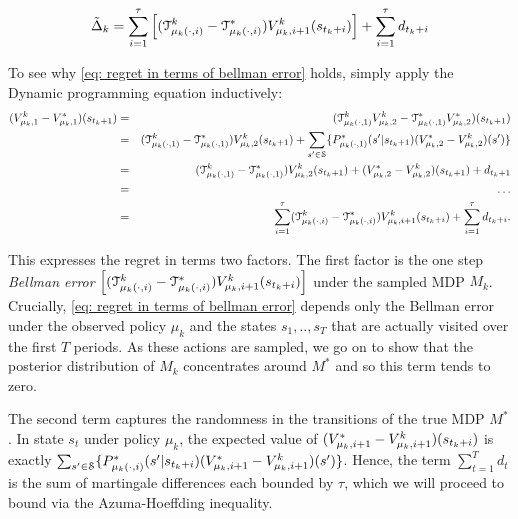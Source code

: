 \begin{equation} \label{eq: regret in terms of bellman error}
\tilde{\Delta}_k = \sum_{i=1}^{\tau} \left[(\mathcal{T}_{\mu_{k}(\cdot,i)}^{k}-\mathcal{T}_{\mu_{k}(\cdot,i)}^{*})V^k_{\mu_{k},i+1}(s_{t_k+i})   \right] + \sum_{i=1}^{\tau} d_{t_k+i}
\end{equation}

To see why \eqref{eq: regret in terms of bellman error} holds, simply apply the Dynamic programming equation inductively: 
\begin{eqnarray*}
(V_{\mu_{k},1}^{k}-V_{\mu_{k},1}^{*})(s_{t_k+1}) &=& (\mathcal{T}_{\mu_{k}(\cdot,1)}^{k} V_{\mu_{k},2}^{k} - \mathcal{T}_{\mu_{k}(\cdot,1)}^{*} V_{\mu_{k},2}^{*})(s_{t_k+1})\\
&=& (\mathcal{T}_{\mu_{k}(\cdot,1)}^{k}-\mathcal{T}_{\mu_{k}(\cdot,1)}^{*}) V_{\mu_{k},2}^{k}(s_{t_k+1})+ \sum_{s' \in \mathcal{S}} \{P_{\mu_k(\cdot, 1)}^{*}(s' \vert s_{t_k+1})(V_{\mu_{k},2}^{*}-V_{\mu_{k},2}^{k})(s') \}\\
&=& (\mathcal{T}_{\mu_{k}(\cdot,1)}^{k}-\mathcal{T}_{\mu_{k}(\cdot,1)}^{*}) V_{\mu_{k},2}^{k}(s_{t_k+1})+(V_{\mu_{k},2}^{*}-V_{\mu_{k},2}^{k})(s_{t_k+1})+d_{t_k+1}\\
&=& \dots \\
&=& \sum_{i=1}^{\tau} (\mathcal{T}_{\mu_{k}(\cdot,i)}^{k}-\mathcal{T}_{\mu_{k}(\cdot,i)}^{*}) V_{\mu_{k}, i+1}^{k}(s_{t_k+i})+\sum_{i=1}^{\tau} d_{t_k+i}.
\end{eqnarray*}

This expresses the regret in terms two factors. The first factor is the one step \emph{Bellman error} $\left[(\mathcal{T}_{\mu_{k}(\cdot,i)}^{k}-\mathcal{T}_{\mu_{k}(\cdot,i)}^{*}) V_{\mu_{k}, i+1}^{k}(s_{t_k+i})   \right]$ under the sampled MDP $M_k$. Crucially, \eqref{eq: regret in terms of bellman error} depends only the Bellman error under the observed policy $\mu_k$ and the states $s_1,..,s_T$ that are actually visited over the first $T$ periods. As these actions are sampled, we go on to show that the posterior distribution of $M_k$ concentrates around $M^*$ and so this term tends to zero. 

The second term captures the randomness in the transitions of the true MDP $M^*$. In state $s_t$ under policy $\mu_k$, the expected value of 
$(V_{\mu_{k},i+1}^{*}-V_{\mu_{k},i+1}^{k})(s_{t_k+i})$
is exactly
$\sum_{s' \in \mathcal{S}} \{P_{\mu_{k}(\cdot,i)}^{*}(s' \vert s_{t_k+i})(V_{\mu_{k},i+1}^{*}-V_{\mu_{k},i+1}^{k})(s') \}$.
Hence, the term $\sum_{t=1}^{T} d_t$ is the sum of martingale differences each bounded by $\tau$,
which we will proceed to bound via the Azuma-Hoeffding inequality.




